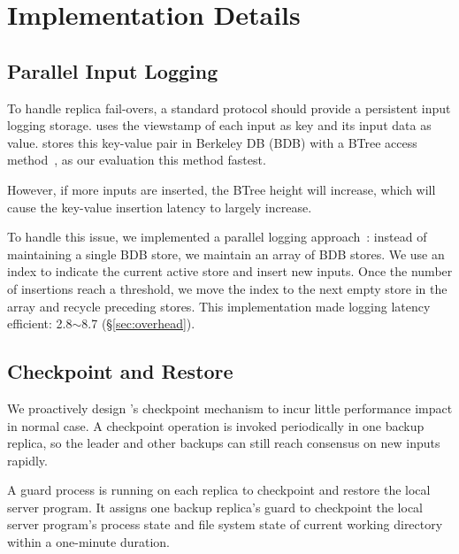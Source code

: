 \section{Implementation Details} \label{sec:impl}


\subsection{Parallel Input Logging} \label{sec:logging}

To handle replica fail-overs, a standard \paxos protocol should provide a 
persistent input logging storage. \xxx uses the \paxos viewstamp of each input 
as key and its input data as value. \xxx stores this key-value pair in 
Berkeley DB (BDB) with a BTree access method~\cite{berkeleydb}, as our 
evaluation this method fastest.

However, if more inputs are inserted, the BTree 
height will increase, which will cause the key-value insertion latency to 
largely increase.

To handle this issue, we implemented a parallel logging 
approach~\cite{Bessani:usenix13}: instead of maintaining a 
single BDB store, we maintain an array of BDB stores. We use an index to 
indicate the current active store and insert new inputs. Once the number of 
insertions reach a threshold, we move the index to the next empty store in the 
array and recycle preceding stores. This implementation made 
\xxx logging latency efficient: 2.8$\sim$8.7 \us (\S\ref{sec:overhead}).

\subsection{Checkpoint and Restore} \label{sec:checkpoint}

We proactively design \xxx's checkpoint mechanism to incur little performance 
impact in normal case. A checkpoint operation is invoked periodically 
in one backup replica, so the leader and other backups can still reach 
consensus on new inputs rapidly.

A guard process is running on each replica to checkpoint and restore the 
local server program. It assigns one backup 
replica's guard to checkpoint the local server program's process state and file 
system state of current working directory within a one-minute duration.

